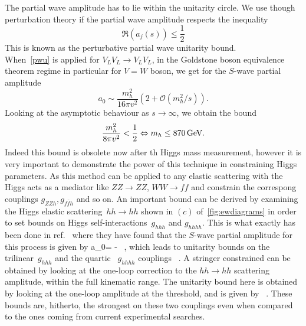 The partial wave amplitude has to lie within the unitarity circle. We use though perturbation theory if the  partial wave amplitude respects the inequality
\begin{equation}
	\mathfrak{R} (a_j(s)) \leq \frac{1}{2}
	\label{pwu}
\end{equation}
This is known as the perturbative partial wave unitarity bound.  \\
When~\eqref{pwu} is applied for  $V_L V_L \to V_L V_L$, in the Goldstone boson equivalence theorem regime in particular for $V=W$ boson, we get for the $S$-wave partial amplitude
\begin{equation}
	a_0 \sim \frac{m_h^2}{16 \pi  v^2} \left( 2+\mathcal{O} \left(m_h^2/s \right) \right) .
\end{equation}
Looking at the asymptotic behaviour as $ s \to \infty$, we obtain the bound
\begin{equation}
	\frac{m_h^2}{8 \pi v^2} < {1\over 2}  \Leftrightarrow  m_h \leq 870 \,\GeV.
\end{equation}
Indeed this bound is obsolete now after th Higgs mass measurement, however it is very important to demonstrate the power of this technique in constraining Higgs parameters. As this method can be applied to any elastic scattering with the Higgs acts as a mediator like $ZZ\to ZZ$, $WW \to ff$ and constrain the correspong couplings $ g_{ZZh}, g_{f\bar f h}$ and so on. An important bound can be derived by examining the Higgs elastic scattering~$hh \to hh$ shown in $(c)$ of~\autoref{fig:ewdiagrams} in order to set bounds on Higgs self-interactions~$g_{hhh}$ and $g_{hhhh}$. This is what exactly has been done in ref.~\cite{DiLuzio:2017tfn}  where they have found that the $S$-wave partial amplitude for this process is given by
\beq 
\label{a0hhtohh}
a_0= -    \, ,
\eeq
which leads to unitarity bounds on the trilinear~$g_{hhh}$ and the quartic ~$g_{hhhh}$ couplings 
\beq
\label{unitaritybounds}
  
\qquad {} \qquad
{}  \, .
\eeq
A stringer constrained can be obtained by looking at the one-loop correction to the $hh\to hh$ scattering amplitude, within the full kinematic range.
The unitarity bound here is obtained by looking at the one-loop  amplitude at the threshold, and is given by
\beq 
\label{pertboundhhhmax}
  \, .
\eeq
These bounds are, hitherto, the strongest on these two couplings even when compared to the ones coming from current experimental searches. 
